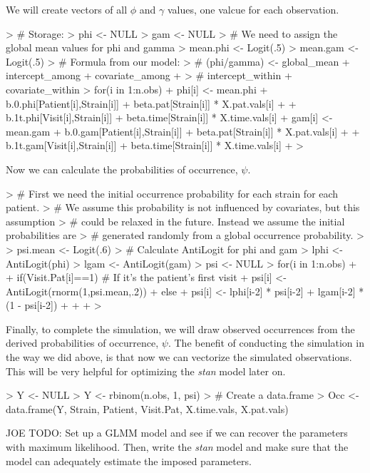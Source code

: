 \documentclass{article}
\begin{document}
We will create vectors of all $\phi$ and $\gamma$ values, one valcue for each observation. 
\begin{Schunk}
\begin{Sinput}
> # Storage:
> phi <- NULL
> gam <- NULL
> # We need to assign the global mean values for phi and gamma
> mean.phi <- Logit(.5)
> mean.gam <- Logit(.5)
> # Formula from our model:
> # (phi/gamma) <- global_mean + intercept_among + covariate_among + 
> #                     intercept_within + covariate_within
> for(i in 1:n.obs){
+   phi[i] <- mean.phi + b.0.phi[Patient[i],Strain[i]] + beta.pat[Strain[i]] * X.pat.vals[i] + 
+                 b.1t.phi[Visit[i],Strain[i]] + beta.time[Strain[i]] * X.time.vals[i]
+   gam[i] <- mean.gam + b.0.gam[Patient[i],Strain[i]] + beta.pat[Strain[i]] * X.pat.vals[i] + 
+                 b.1t.gam[Visit[i],Strain[i]] + beta.time[Strain[i]] * X.time.vals[i]
+ }
> 
\end{Sinput}
\end{Schunk}

Now we can calculate the probabilities of occurrence, $\psi$.
\begin{Schunk}
\begin{Sinput}
> # First we need the initial occurrence probability for each strain for each patient.
> # We assume this probability is not influenced by covariates, but this assumption
> # could be relaxed in the future. Instead we assume the initial probabilities are
> # generated randomly from a global occurrence probability.
> 
> psi.mean <- Logit(.6)
> # Calculate AntiLogit for phi and gam
> lphi <- AntiLogit(phi)
> lgam <- AntiLogit(gam)
> psi <- NULL
> for(i in 1:n.obs){
+   
+   if(Visit.Pat[i]==1){ # If it's the patient's first visit
+     psi[i] <- AntiLogit(rnorm(1,psi.mean,.2))
+   }else{
+     psi[i] <- lphi[i-2] * psi[i-2] + lgam[i-2] * (1 - psi[i-2]) 
+   }
+   
+ }
> 
\end{Sinput}
\end{Schunk}

Finally, to complete the simulation, we will draw observed occurrences from the derived probabilities of occurrence, $\psi$. The benefit of conducting the simulation in the way we did above, is that now we can vectorize the simulated observations. This will be very helpful for optimizing the \emph{stan} model later on.
\begin{Schunk}
\begin{Sinput}
> Y <- NULL
> Y <- rbinom(n.obs, 1, psi)
> # Create a data.frame
> Occ <- data.frame(Y, Strain, Patient, Visit.Pat, X.time.vals, X.pat.vals)
\end{Sinput}
\end{Schunk}

JOE TODO: Set up a GLMM model and see if we can recover the parameters with maximum likelihood. Then, write the \emph{stan} model and make sure that the model can adequately estimate the imposed parameters. 
\end{document}

